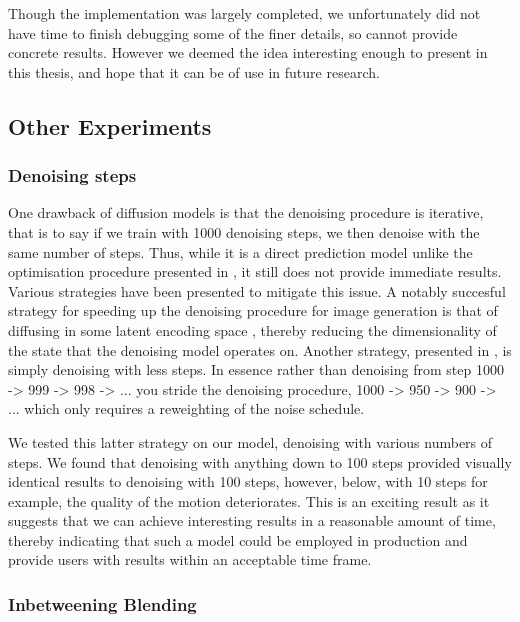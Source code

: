 Though the implementation was largely completed, we unfortunately did not have time to finish debugging some of the finer details, so cannot provide concrete results. However we deemed the idea interesting enough to present in this thesis, and hope that it can be of use in future research.


\subsection{Other Experiments}
\subsubsection{Denoising steps}
One drawback of diffusion models is that the denoising procedure is iterative, that is to say if we train with 1000 denoising steps, we then denoise with the same number of steps. Thus, while it is a direct prediction model unlike the optimisation procedure presented in , it still does not provide immediate results. Various strategies have been presented to mitigate this issue. A notably succesful strategy for speeding up the denoising procedure for image generation is that of diffusing in some latent encoding space \cite{stable_diffusion}, thereby reducing the dimensionality of the state that the denoising model operates on. Another strategy, presented in \cite{improved_diffusion}, is simply denoising with less steps. In essence rather than denoising from step 1000 -> 999 -> 998 -> ... you stride the denoising procedure, 1000 -> 950 -> 900 -> ... which only requires a reweighting of the noise schedule. 

We tested this latter strategy on our model, denoising with various numbers of steps. We found that denoising with anything down to 100 steps provided visually identical results to denoising with 100 steps, however, below, with 10 steps for example, the quality of the motion deteriorates. This is an exciting result as it suggests that we can achieve interesting results in a reasonable amount of time, thereby indicating that such a model could be employed in production and provide users with results within an acceptable time frame.

\subsubsection{Inbetweening Blending}
\label{sec:diffusion_inbetweening_blending}

